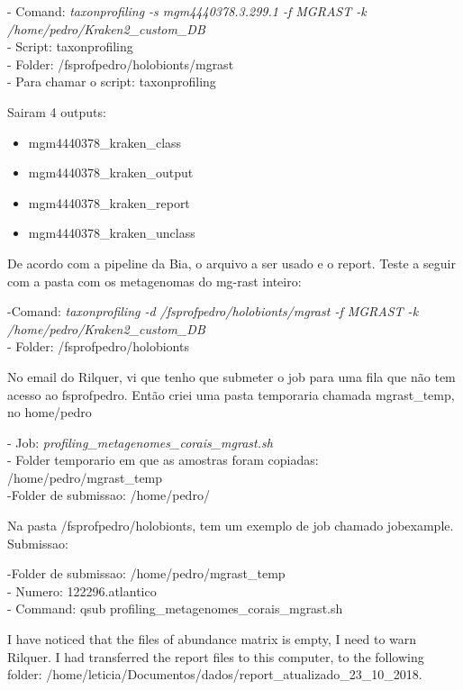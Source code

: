 \documentclass[12pt, a4paper]{report}
\begin{document}
\begin{tcolorbox}[width=6.3in]
- Comand: \textit{taxonprofiling -s mgm4440378.3.299.1 -f MGRAST -k /home/pedro/Kraken2\_custom\_DB}\\
- Script: taxonprofiling\\
- Folder: /fsprofpedro/holobionts/mgrast\\
- Para chamar o script: taxonprofiling
\end{tcolorbox}

Sairam 4 outputs:
\begin{itemize}
\item mgm4440378\_kraken\_class
\item mgm4440378\_kraken\_output
\item mgm4440378\_kraken\_report
\item mgm4440378\_kraken\_unclass
\end{itemize}

De acordo com a pipeline da Bia, o arquivo a ser usado e o report. Teste a seguir com a pasta com os metagenomas do mg-rast inteiro:

\begin{tcolorbox}[width=6.3in]
-Comand: \textit{taxonprofiling -d /fsprofpedro/holobionts/mgrast -f MGRAST -k /home/pedro/Kraken2\_custom\_DB}\\
- Folder: /fsprofpedro/holobionts
\end{tcolorbox}

No email do Rilquer, vi que tenho que submeter o job para uma fila que não tem acesso ao fsprofpedro. Então criei uma pasta temporaria chamada mgrast\_temp, no home/pedro

\begin{tcolorbox}
- Job: \textit{profiling\_metagenomes\_corais\_mgrast.sh}\\
- Folder temporario em que as amostras foram copiadas: /home/pedro/mgrast\_temp \\
-Folder de submissao:  /home/pedro/
\end{tcolorbox}

Na pasta /fsprofpedro/holobionts, tem um exemplo de job chamado jobexample. Submissao:
\begin{tcolorbox}
-Folder de submissao: /home/pedro/mgrast\_temp \\
- Numero: 122296.atlantico\\
- Command: qsub profiling\_metagenomes\_corais\_mgrast.sh
\end{tcolorbox}

I have noticed that the files of abundance matrix is empty, I need to warn Rilquer. I had transferred the report files to this computer, to the following folder: /home/leticia/Documentos/dados/report\_atualizado\_23\_10\_2018.
\end{document}
